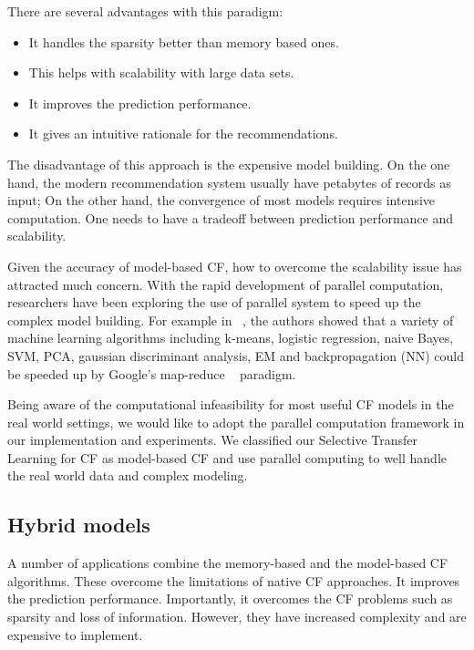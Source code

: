 There are several advantages with this paradigm:
\begin{itemize}
\item It handles the sparsity better than memory based ones.
\item This helps with scalability with large data sets.
\item It improves the prediction performance.
\item It gives an intuitive rationale for the recommendations.
\end{itemize}

The disadvantage of this approach is the expensive model building. On the one hand, the modern recommendation system usually have petabytes of records as input; On the other hand, the convergence of most models requires intensive computation. One needs to have a tradeoff between prediction performance and scalability.

Given the accuracy of model-based CF, how to overcome the scalability issue has attracted much concern. With the rapid development of parallel computation, researchers have been exploring the use of parallel system to speed up the complex model building. For example in ~\cite{chu2007map}, the authors showed that a variety of machine learning algorithms including k-means, logistic regression, naive Bayes, SVM, PCA, gaussian discriminant analysis, EM and backpropagation (NN) could be speeded up by Google's map-reduce ~\cite{dean2008mapreduce} paradigm.

Being aware of the computational infeasibility for most useful CF models in the real world settings, we would like to adopt the parallel computation framework in our implementation and experiments. We classified our Selective Transfer Learning for CF as model-based CF and use parallel computing to well handle the real world data and complex modeling.

\hspace{0.05in}
\subsection{Hybrid models}
A number of applications \cite{das2007google} combine the memory-based and the model-based CF algorithms. These overcome the limitations of native CF approaches. It improves the prediction performance. Importantly, it overcomes the CF problems such as sparsity and loss of information. However, they have increased complexity and are expensive to implement.

\hspace{0.1in}
